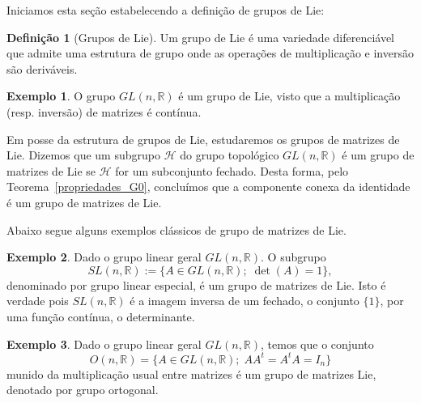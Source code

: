 \documentclass[twoside,openright,titlepage,numbers=noenddot,headinclude,  lineheaders footinclude=true,cleardoublepage=empty,
                                BCOR=5mm,paper=a4,fontsize=12pt ]{scrbook}
\theoremstyle{definition}
\newtheorem{definicao}{Definição}[chapter]
\newtheorem{exmp}{Exemplo}[section]
\begin{document}
Iniciamos esta seção estabelecendo a definição de grupos de Lie:
\begin{definicao}[Grupos de Lie] 
Um grupo de Lie é uma variedade diferenciável que
admite uma estrutura de grupo onde as operações de multiplicação e inversão são deriváveis.
\end{definicao}

\begin{exmp}
O grupo $GL(n, \mathbb{R})$ é um grupo de Lie, visto que a multiplicação (resp. inversão) de matrizes
é contínua.
\end{exmp}

Em posse da estrutura de grupos de Lie, estudaremos os grupos de matrizes de Lie.
Dizemos que um subgrupo $\mathcal{H}$ do grupo topológico $GL(n, \mathbb{R})$ é um grupo de matrizes de Lie se $\mathcal{H}$ 
for um subconjunto fechado. 
Desta forma, pelo Teorema~\ref{propriedades_G0}, concluímos que a componente conexa da identidade é um grupo de matrizes de Lie.

Abaixo segue alguns exemplos clássicos de grupo de matrizes de Lie.
\begin{exmp} \label{exmp:det1}
Dado o grupo linear geral $GL(n, \mathbb{R})$. O subgrupo 
\[ SL(n, \mathbb{R}) := \{ A \in GL(n, \mathbb{R}); \; \det(A) = 1\}, \]
denominado por grupo linear especial, é um grupo de matrizes de Lie. Isto é verdade
pois 
$SL(n, \mathbb{R})$ é a
imagem inversa de um fechado, o conjunto $\{1\}$, por uma função contínua, o determinante.
\end{exmp}


\begin{exmp}\label{subgrupoH}
Dado o grupo linear geral $GL(n, \mathbb{R})$, temos que o conjunto
\[ O(n, \mathbb{R}) = \{ A \in GL(n, \mathbb{R}); \; AA^t = A^tA = I_n  \} \]
munido da multiplicação usual entre matrizes é um grupo de matrizes Lie, denotado por grupo ortogonal.
\end{exmp}
\end{document}
